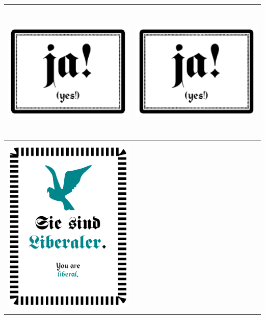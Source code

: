 \documentclass[12pt,a4paper,spanish]{article}
\begin{document}
	\newpage
	
	\begin{table}
		\centering
		\begin{tabular}{|c|c|}
			\toprule
			\includegraphics[height=6.74cm]{./Drawings/ja!.pdf} &
			\includegraphics[height=6.74cm]{./Drawings/ja!.pdf} \\
			\midrule
			\includegraphics[height=8.7cm, angle=90]{./Drawings/role_liberal.pdf} &

\end{tabular}
\end{table}
\end{document}
